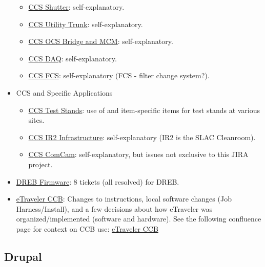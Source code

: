 \begin{itemize}
\begin{itemize}
		\item \href{https://jira.slac.stanford.edu/browse/LSSTCCSSHUTTER}{CCS Shutter}:  self-explanatory.
		\item \href{https://jira.slac.stanford.edu/browse/LSSTCCSUT}{CCS Utility Trunk}:  self-explanatory.
		\item \href{https://jira.slac.stanford.edu/browse/LCOBM}{CCS OCS Bridge and MCM}:  self-explanatory.
		\item \href{https://jira.slac.stanford.edu/browse/LSSTCCSDAQ}{CCS DAQ}:  self-explanatory.
		\item \href{https://jira.slac.stanford.edu/browse/LSSTCCSFCS}{CCS FCS}:  self-explanatory (FCS - filter change system?).
	\end{itemize}
	\item CCS and Specific Applications
	\begin{itemize}
		\item \href{https://jira.slac.stanford.edu/browse/LSSTCCSTS}{CCS Test Stands}:  use of and item-specific items for test stands at various sites.
		\item \href{https://jira.slac.stanford.edu/browse/LSSTIR}{CCS IR2 Infrastructure}:  self-explanatory (IR2 is the SLAC Cleanroom).
		\item \href{https://jira.slac.stanford.edu/browse/LSSTCCSCOM}{CCS ComCam}:  self-explanatory, but issues not exclusive to this JIRA project.
	\end{itemize}
	\item \href{https://jira.slac.stanford.edu/browse/LSSTDREB}{DREB Firmware}:  8 tickets (all resolved) for DREB.
	\item \href{https://jira.slac.stanford.edu/browse/ETCCB}{eTraveler CCB}:  Changes to instructions, local software changes (Job Harness/Install), and a few decisions about how eTraveler was organized/implemented (software and hardware). See the following confluence page for context on CCB use: \href{https://confluence.slac.stanford.edu/display/LSSTCAM/eTraveler+CCB}{eTraveler CCB}
\end{itemize}

\subsection{Drupal}

